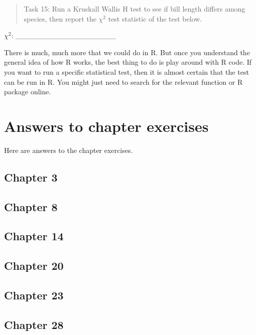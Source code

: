 \documentclass[
]{scrbook}
\begin{document}
\begin{quote}
Task 15: Run a Kruskall Wallis H test to see if bill length differs among species, then report the \(\chi^{2}\) test statistic of the test below.
\end{quote}

\(\chi^{2}\): \_\_\_\_\_\_\_\_\_\_\_\_\_\_\_\_\_\_\_

There is much, much more that we could do in R.
But once you understand the general idea of how R works, the best thing to do is play around with R code.
If you want to run a specific statistical test, then it is almost certain that the test can be run in R.
You might just need to search for the relevant function or R package online.

\hypertarget{appendix-appendix}{%
\appendix}


\hypertarget{appendexA}{%
\chapter{Answers to chapter exercises}\label{appendexA}}

Here are answers to the chapter exercises.

\hypertarget{chapter-3}{%
\section{Chapter 3}\label{chapter-3}}

\hypertarget{chapter-8}{%
\section{Chapter 8}\label{chapter-8}}

\hypertarget{chapter-14}{%
\section{Chapter 14}\label{chapter-14}}

\hypertarget{chapter-20}{%
\section{Chapter 20}\label{chapter-20}}

\hypertarget{chapter-23}{%
\section{Chapter 23}\label{chapter-23}}

\hypertarget{chapter-28}{%
\section{Chapter 28}\label{chapter-28}}
\end{document}
